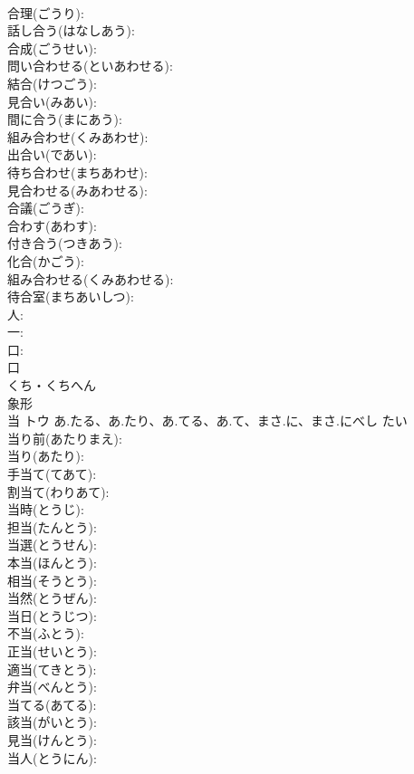 \documentclass[8pt]{extreport}
\begin{document}
\begin{CJK}{UTF8}{min}
\\	合理(ごうり): 
\\	話し合う(はなしあう): 
\\	合成(ごうせい): 
\\	問い合わせる(といあわせる): 
\\	結合(けつごう): 
\\	見合い(みあい): 
\\	間に合う(まにあう): 
\\	組み合わせ(くみあわせ): 
\\	出合い(であい): 
\\	待ち合わせ(まちあわせ): 
\\	見合わせる(みあわせる): 
\\	合議(ごうぎ): 
\\	合わす(あわす): 
\\	付き合う(つきあう): 
\\	化合(かごう): 
\\	組み合わせる(くみあわせる): 
\\	待合室(まちあいしつ): 
\\	人: 
\\	一: 
\\	口: 
\\	口	
\\	くち・くちへん	
\\	象形 
\\	当	トウ	あ.たる、あ.たり、あ.てる、あ.て、まさ.に、まさ.にべし	たい	
\\	当り前(あたりまえ): 
\\	当り(あたり): 
\\	手当て(てあて): 
\\	割当て(わりあて): 
\\	当時(とうじ): 
\\	担当(たんとう): 
\\	当選(とうせん): 
\\	本当(ほんとう): 
\\	相当(そうとう): 
\\	当然(とうぜん): 
\\	当日(とうじつ): 
\\	不当(ふとう): 
\\	正当(せいとう): 
\\	適当(てきとう): 
\\	弁当(べんとう): 
\\	当てる(あてる): 
\\	該当(がいとう): 
\\	見当(けんとう): 
\\	当人(とうにん): 

\end{CJK}
\end{document}
